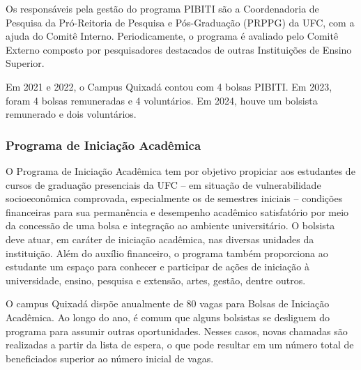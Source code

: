 
Os responsáveis pela gestão do programa PIBITI são a Coordenadoria de Pesquisa da Pró-Reitoria de Pesquisa e Pós-Graduação (PRPPG) da UFC, com a ajuda do Comitê Interno. Periodicamente, o programa é avaliado pelo Comitê Externo composto por pesquisadores destacados de outras Instituições de Ensino Superior.

Em 2021 e 2022, o Campus Quixadá contou com 4 bolsas PIBITI. Em 2023, foram 4 bolsas remuneradas e 4 voluntários. Em 2024, houve um bolsista remunerado e dois voluntários.

\subsubsection{Programa de Iniciação Acadêmica}

O Programa de Iniciação Acadêmica tem por objetivo  propiciar aos estudantes de cursos de graduação presenciais da UFC – em situação de vulnerabilidade socioeconômica comprovada, especialmente os de semestres iniciais – condições financeiras para sua permanência e desempenho acadêmico satisfatório por meio  da concessão de uma bolsa e integração ao ambiente universitário. O bolsista deve atuar, em caráter de iniciação acadêmica, nas diversas unidades da instituição. Além do auxílio financeiro, o programa também proporciona ao estudante um espaço para conhecer e participar de ações de iniciação à universidade, ensino, pesquisa e extensão, artes, gestão, dentre outros.

O campus Quixadá dispõe anualmente de 80 vagas para Bolsas de Iniciação Acadêmica. Ao longo do ano, é comum que alguns bolsistas se desliguem do programa para assumir outras oportunidades. Nesses casos, novas chamadas são realizadas a partir da lista de espera, o que pode resultar em um número total de beneficiados superior ao número inicial de vagas.




